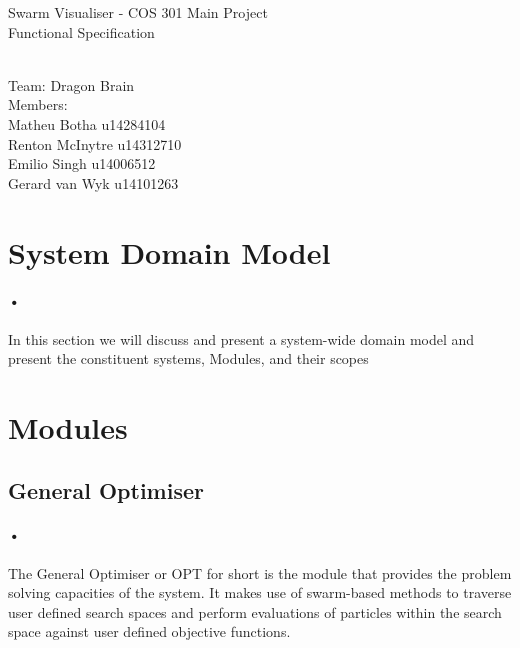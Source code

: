 \documentclass[11pt]{article}
\begin{document}
\begin{titlepage}

\begin{center}
\begin{huge}
Swarm Visualiser - COS 301 Main Project
\\
Functional Specification
\begin{small}
\\
Team: Dragon Brain
\\
Members:
\\
Matheu Botha u14284104
\\
Renton McInytre u14312710
\\
Emilio Singh u14006512
\\
Gerard van Wyk u14101263

\end{small}

\end{huge}
\end{center}
\end{titlepage}

\pagebreak

\tableofcontents

\pagebreak
\section{System Domain Model}
\paragraph{•}
In this section we will discuss and present a system-wide domain model and present the constituent systems, Modules, and their scopes

\begin{figure}[h]

\end{figure}
\section{Modules}
\subsection{General Optimiser}
\paragraph{•}
The General Optimiser or OPT for short is the module that provides the problem solving capacities of the system. It makes use of swarm-based methods to traverse user defined search spaces and perform evaluations of particles within the search space against user defined objective functions.
\end{document}
